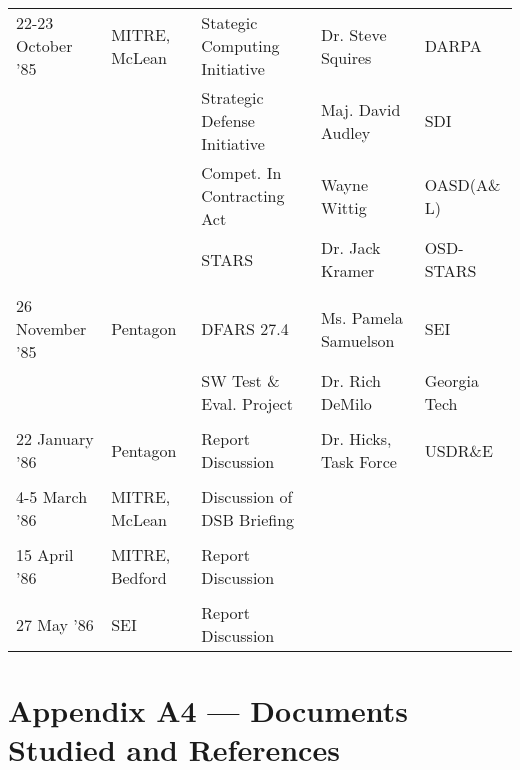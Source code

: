 \documentclass[12pt,final]{article}
\begin{document}
\begin{footnotesize}
\begin{tabular}{ l l l l l }
\\
22-23 October ’85 & MITRE, McLean & Stategic Computing Initiative & Dr. Steve Squires & DARPA\\
 & & Strategic Defense Initiative  & Maj. David Audley & SDI\\
 & & Compet. In Contracting Act    & Wayne Wittig      & OASD(A\& L)   \\
 & & STARS                         & Dr. Jack Kramer   & OSD-STARS      \\
\\
26 November ’85 & Pentagon    & DFARS 27.4                & Ms. Pamela Samuelson & SEI           \\
                         & &  SW Test \& Eval. Project  & Dr. Rich DeMilo      & Georgia Tech      \\
\\
22 January ’86 & Pentagon & Report Discussion & Dr. Hicks, Task Force & USDR\&E\\
\\
    4-5 March ’86 & MITRE, McLean & Discussion of DSB Briefing\\
\\
    15 April ’86 & MITRE, Bedford & Report Discussion\\
\\
    27 May ’86 & SEI & Report Discussion\\
\end{tabular}
\end{footnotesize}


\newpage

\section*{Appendix A4 — Documents Studied and References}
\end{document}
